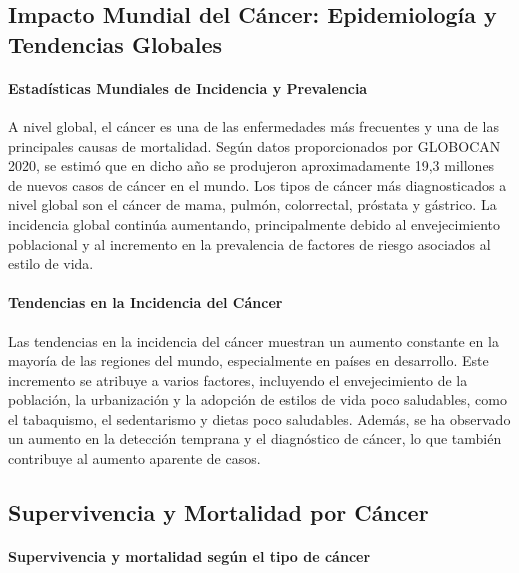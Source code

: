 \subsection{Impacto Mundial del Cáncer: Epidemiología y Tendencias Globales}
\label{sec:impact-cancer}

\paragraph[short]{Estadísticas Mundiales de Incidencia y Prevalencia}

A nivel global, el cáncer es una de las enfermedades más frecuentes y una de las principales causas de mortalidad. Según datos proporcionados por GLOBOCAN 2020\cite{globocan2020}, se estimó que en dicho año se produjeron aproximadamente 19,3 millones de nuevos casos de cáncer en el mundo. Los tipos de cáncer más diagnosticados a nivel global son el cáncer de mama, pulmón, colorrectal, próstata y gástrico. La incidencia global continúa aumentando, principalmente debido al envejecimiento poblacional y al incremento en la prevalencia de factores de riesgo asociados al estilo de vida.

\paragraph[short]{Tendencias en la Incidencia del Cáncer}
Las tendencias en la incidencia del cáncer muestran un aumento constante en la mayoría de las regiones del mundo, especialmente en países en desarrollo. Este incremento se atribuye a varios factores, incluyendo el envejecimiento de la población, la urbanización y la adopción de estilos de vida poco saludables, como el tabaquismo, el sedentarismo y dietas poco saludables. Además, se ha observado un aumento en la detección temprana y el diagnóstico de cáncer, lo que también contribuye al aumento aparente de casos\cite{Zhou2024}.
\subsection{Supervivencia y Mortalidad por Cáncer}
\label{sec:survival-mortality}


\paragraph[short]{Supervivencia y mortalidad según el tipo de cáncer}

